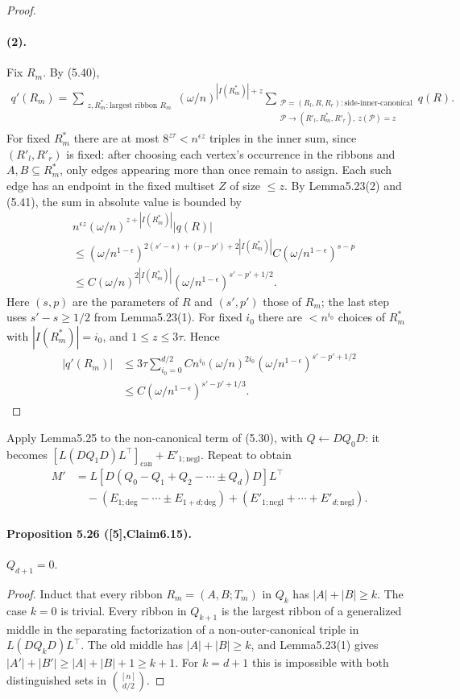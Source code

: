 \documentclass[10pt,a4paper]{article}
\begin{document}
\begin{proof}
\paragraph{(2).} Fix $R_m$. By (5.40),
\begin{align*}q'(R_m)=\sum_{\substack{z,R^*_m:\text{largest ribbon }R_m}}(\omega/n)^{|I(R^*_m)|+z}\sum_{\substack{\mathcal P=(R_l,R,R_r):\text{side-inner-canonical}\\\mathcal P\to(R'_l,R^*_m,R'_r),\ z(\mathcal P)=z}}q(R).
\end{align*}
For fixed $R^*_m$ there are at most $8^{z\tau}<n^{\epsilon z}$ triples in the inner sum, since $(R'_l,R'_r)$ is fixed: after choosing each vertex's occurrence in the ribbons and $A,B\subseteq R^*_m$, only edges appearing more than once remain to assign. Each such edge has an endpoint in the fixed multiset $Z$ of size $\le z$. By Lemma5.23(2) and (5.41), the sum in absolute value is bounded by
\begin{align*}&n^{\epsilon z}(\omega/n)^{z+|I(R^*_m)|}|q(R)|\\&\le(\omega/n^{1-\epsilon})^{2(s'-s)+(p-p')+2|I(R^*_m)|}C(\omega/n^{1-\epsilon})^{s-p}\\&\le C(\omega/n)^{2|I(R^*_m)|}(\omega/n^{1-\epsilon})^{s'-p'+1/2}.\end{align*}
Here $(s,p)$ are the parameters of $R$ and $(s',p')$ those of $R_m$; the last step uses $s'-s\ge1/2$ from Lemma5.23(1). For fixed $i_0$ there are $<n^{i_0}$ choices of $R^*_m$ with $|I(R^*_m)|=i_0$, and $1\le z\le3\tau$. Hence
\begin{align*}|q'(R_m)|&\le3\tau\sum_{i_0=0}^{d/2}Cn^{i_0}(\omega/n)^{2i_0}(\omega/n^{1-\epsilon})^{s'-p'+1/2}\\&\le C(\omega/n^{1-\epsilon})^{s'-p'+1/3}.\end{align*}\end{proof}
Apply Lemma5.25 to the non-canonical term of (5.30), with $Q\leftarrow DQ_0D$: it becomes $[L(DQ_1D)L^\top]_{\mathrm{can}}+E'_{1;\mathrm{negl}}$. Repeat to obtain
\begin{align*}M'&=L[D(Q_0-Q_1+Q_2-\cdots\pm Q_d)D]L^\top\\&\quad-(E_{1;\mathrm{deg}}-\cdots\pm E_{1+d;\mathrm{deg}})+(E'_{1;\mathrm{negl}}+\cdots+E'_{d;\mathrm{negl}}).\tag{5.45}\end{align*}
\paragraph{Proposition 5.26 ([5],Claim6.15).} $Q_{d+1}=0$.
\begin{proof}Induct that every ribbon $R_m=(A,B;T_m)$ in $Q_k$ has $|A|+|B|\ge k$. The case $k=0$ is trivial. Every ribbon in $Q_{k+1}$ is the largest ribbon of a generalized middle in the separating factorization of a non-outer-canonical triple in $L(DQ_kD)L^\top$. The old middle has $|A|+|B|\ge k$, and Lemma5.23(1) gives $|A'|+|B'|\ge|A|+|B|+1\ge k+1$. For $k=d+1$ this is impossible with both distinguished sets in $\binom{[n]}{d/2}$.\end{proof}
\end{document}
